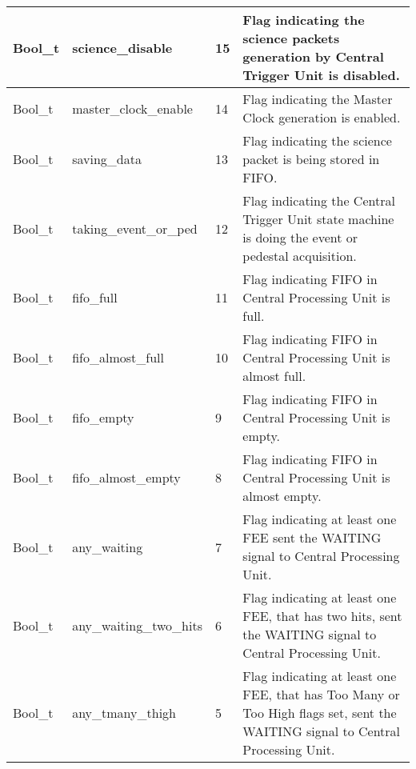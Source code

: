 \documentclass[a4paper, 12pt, onecolumn]{article}
\begin{document}
\begin{center}
  \label{tab:trigg-status-bit}    
  \tablelasttail{\hline}
  \begin{supertabular}{| p{15mm} | p{37mm} | p{7mm} | p{60mm} |}
    Bool\_t   & science\_disable        & 15  & Flag indicating the science packets generation by Central Trigger Unit is disabled. \\\hline
    Bool\_t   & master\_clock\_enable   & 14  & Flag indicating the Master Clock generation is enabled. \\\hline
    Bool\_t   & saving\_data            & 13  & Flag indicating the science packet is being stored in FIFO. \\\hline
    Bool\_t   & taking\_event\_or\_ped  & 12  & Flag indicating the Central Trigger Unit state machine is doing the event or pedestal acquisition. \\\hline
    Bool\_t   & fifo\_full              & 11  & Flag indicating FIFO in Central Processing Unit is full. \\\hline
    Bool\_t   & fifo\_almost\_full      & 10  & Flag indicating FIFO in Central Processing Unit is almost full. \\\hline
    Bool\_t   & fifo\_empty             & 9   & Flag indicating FIFO in Central Processing Unit is empty. \\\hline
    Bool\_t   & fifo\_almost\_empty     & 8   & Flag indicating FIFO in Central Processing Unit is almost empty. \\\hline
    Bool\_t   & any\_waiting            & 7   & Flag indicating at least one FEE sent the WAITING signal to Central Processing Unit. \\\hline
    Bool\_t   & any\_waiting\_two\_hits & 6   & Flag indicating at least one FEE, that has two hits, sent the WAITING signal to Central Processing Unit. \\\hline
    Bool\_t   & any\_tmany\_thigh       & 5   & Flag indicating at least one FEE, that has Too Many or Too High flags set, sent the WAITING signal to Central Processing Unit. \\\hline

\end{supertabular}
\end{center}
\end{document}
